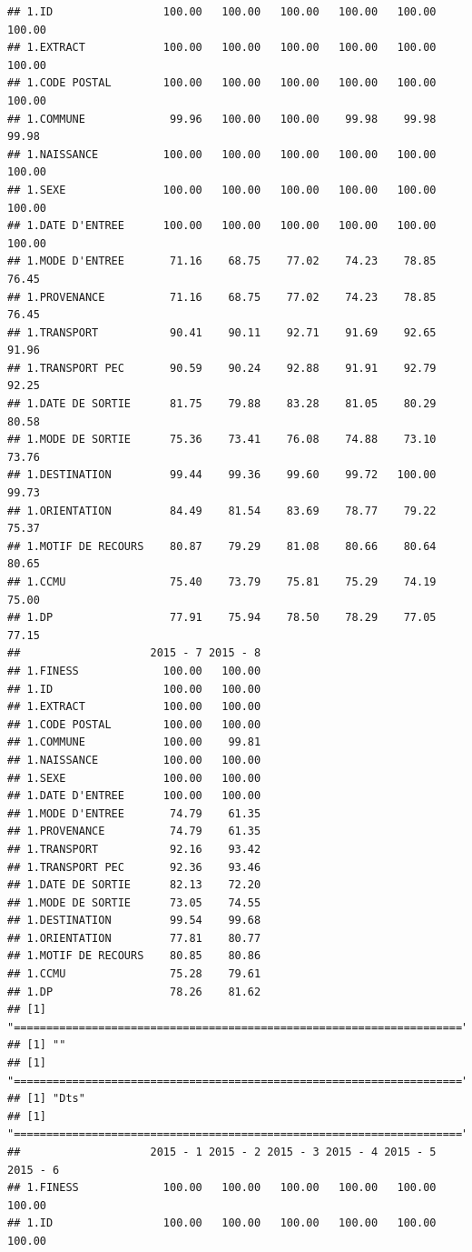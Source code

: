 \documentclass[]{article}
\begin{document}
\begin{verbatim}
## 1.ID                 100.00   100.00   100.00   100.00   100.00   100.00
## 1.EXTRACT            100.00   100.00   100.00   100.00   100.00   100.00
## 1.CODE POSTAL        100.00   100.00   100.00   100.00   100.00   100.00
## 1.COMMUNE             99.96   100.00   100.00    99.98    99.98    99.98
## 1.NAISSANCE          100.00   100.00   100.00   100.00   100.00   100.00
## 1.SEXE               100.00   100.00   100.00   100.00   100.00   100.00
## 1.DATE D'ENTREE      100.00   100.00   100.00   100.00   100.00   100.00
## 1.MODE D'ENTREE       71.16    68.75    77.02    74.23    78.85    76.45
## 1.PROVENANCE          71.16    68.75    77.02    74.23    78.85    76.45
## 1.TRANSPORT           90.41    90.11    92.71    91.69    92.65    91.96
## 1.TRANSPORT PEC       90.59    90.24    92.88    91.91    92.79    92.25
## 1.DATE DE SORTIE      81.75    79.88    83.28    81.05    80.29    80.58
## 1.MODE DE SORTIE      75.36    73.41    76.08    74.88    73.10    73.76
## 1.DESTINATION         99.44    99.36    99.60    99.72   100.00    99.73
## 1.ORIENTATION         84.49    81.54    83.69    78.77    79.22    75.37
## 1.MOTIF DE RECOURS    80.87    79.29    81.08    80.66    80.64    80.65
## 1.CCMU                75.40    73.79    75.81    75.29    74.19    75.00
## 1.DP                  77.91    75.94    78.50    78.29    77.05    77.15
##                    2015 - 7 2015 - 8
## 1.FINESS             100.00   100.00
## 1.ID                 100.00   100.00
## 1.EXTRACT            100.00   100.00
## 1.CODE POSTAL        100.00   100.00
## 1.COMMUNE            100.00    99.81
## 1.NAISSANCE          100.00   100.00
## 1.SEXE               100.00   100.00
## 1.DATE D'ENTREE      100.00   100.00
## 1.MODE D'ENTREE       74.79    61.35
## 1.PROVENANCE          74.79    61.35
## 1.TRANSPORT           92.16    93.42
## 1.TRANSPORT PEC       92.36    93.46
## 1.DATE DE SORTIE      82.13    72.20
## 1.MODE DE SORTIE      73.05    74.55
## 1.DESTINATION         99.54    99.68
## 1.ORIENTATION         77.81    80.77
## 1.MOTIF DE RECOURS    80.85    80.86
## 1.CCMU                75.28    79.61
## 1.DP                  78.26    81.62
## [1] "====================================================================="
## [1] ""
## [1] "====================================================================="
## [1] "Dts"
## [1] "====================================================================="
##                    2015 - 1 2015 - 2 2015 - 3 2015 - 4 2015 - 5 2015 - 6
## 1.FINESS             100.00   100.00   100.00   100.00   100.00   100.00
## 1.ID                 100.00   100.00   100.00   100.00   100.00   100.00

\end{verbatim}
\end{document}

